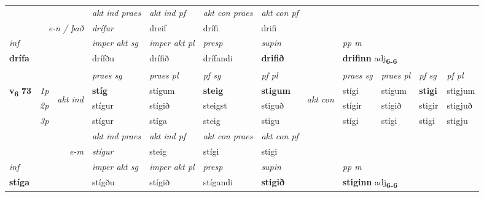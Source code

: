 \begin{longtable}[l]{X>{\footnotesize\itshape}llXXXXlXXXX}
   && &  \textit{akt ind praes} & \textit{akt ind pf} & \textit{akt con praes} & \textit{akt con pf} \\*
\multicolumn{3}{r}{\textit{e-n / það}} & drífur & dreif & drífi & drifi \\*

\cmidrule{4-7}
   {\textit{inf}} & &  & \textit{imper akt sg} & \textit{imper akt pl}   & \textit{presp} & \textit{supin}  && \textit{pp m} \\*
  {\textbf{drífa}} & && drífðu  & drífið   & drífandi &  \textbf{drifið}  && \multicolumn{2}{l}{\textbf{drifinn} adj\textbf{\textsubscript{6-6}}} \\*

\midrule

 & &   & \textit{praes sg}  & \textit{praes pl}    & \textit{ pf sg} & \textit{pf pl} & & \textit{praes sg}  & \textit{praes pl}    & \textit{pf sg} & \textit{pf pl }  \\ \cmidrule{4-7} \cmidrule{9-12}
 \multirow{2}{*}{{{\textbf{v{\textsubscript{6}}} \Large{\textbf{73}}}}}  & 1p & \multirow{3}{*}{\begin{turn}{90}\textit{akt ind}\end{turn}} & \textbf{stíg} & stígum & \textbf{steig} & \textbf{stigum} & \multirow{3}{*}{\begin{turn}{90}\textit{akt con}\end{turn}} &stígi & stígum & \textbf{stigi} & stigjum\\*
 & 2p &  &  stígur  & stígið & steigst & stiguð & & stígir & stígið & stigir & stigjuð \\*
 & 3p &  & stígur & stíga & steig & stigu & & stígi & stígi& stigi & stigju \\*
\cmidrule{4-7} \cmidrule{9-12}

   && &  \textit{akt ind praes} & \textit{akt ind pf} & \textit{akt con praes} & \textit{akt con pf} \\*
\multicolumn{3}{r}{\textit{e-m}} & stígur & steig & stígi & stigi \\*

\cmidrule{4-7}
   {\textit{inf}} & &  & \textit{imper akt sg} & \textit{imper akt pl}   & \textit{presp} & \textit{supin}  && \textit{pp m} \\*
  {\textbf{stíga}} & && stígðu  & stígið   & stígandi &  \textbf{stigið}  && \multicolumn{2}{l}{\textbf{stiginn} adj\textbf{\textsubscript{6-6}}} \\*

\midrule


\end{longtable}
